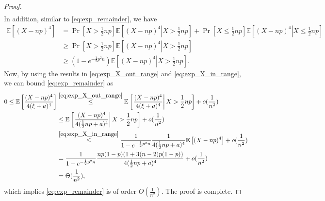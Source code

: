 \documentclass[10pt,a4paper]{amsart}
\newcommand{\EE}{{\mathbb{E}}}
\begin{document}
\begin{proof}
\begin{equation}
\begin{aligned}
			\end{aligned}\label{eq:exp_X_out_range}
		\end{equation}
		In addition, similar to \eqref{eq:exp_remainder}, we have
		\begin{equation}
			\begin{aligned}
				\EE \left[ (X - np)^4 \right] &= \Pr\left[ X > \frac{1}{2} np \right] \EE \left[ \left. (X - np)^4 \right| X > \frac{1}{2}np \right] + \Pr\left[ X \leq \frac{1}{2} np \right] \EE \left[ \left. (X - np)^4 \right| X \leq \frac{1}{2}np \right] \\
				&\geq \Pr\left[ X > \frac{1}{2} np \right] \EE \left[ \left. (X - np)^4 \right| X > \frac{1}{2}np \right] \\
				&\geq \left( 1 - e^{-\frac{1}{2} p^2 n} \right) \EE \left[ \left. (X - np)^4 \right| X > \frac{1}{2}np \right].
			\end{aligned}\label{eq:exp_X_in_range}
		\end{equation}
		Now, by using the results in \eqref{eq:exp_X_out_range} and \eqref{eq:exp_X_in_range}, we can bound \eqref{eq:exp_remainder} as
		\begin{equation}
			\begin{aligned}
				0 \leq \EE \left[ \frac{(X - np)^4}{4 (\xi + a)^4} \right] &\overset{\eqref{eq:exp_X_out_range}}{\leq} \EE \left[ \left. \frac{(X - np)^4}{4 (\xi + a)^4} \right| X > \frac{1}{2}np \right] + o(\frac{1}{n^2}) \\
				&\leq \EE \left[ \left. \frac{(X - np)^4}{4 (\frac{1}{2}np + a)^4} \right| X > \frac{1}{2}np \right] + o(\frac{1}{n^2}) \\
				&\overset{\eqref{eq:exp_X_in_range}}{\leq} \frac{1}{1 - e^{-\frac{1}{2} p^2 n}} \frac{1}{4 (\frac{1}{2}np + a)^4} \EE \left[ (X - np)^4 \right] + o(\frac{1}{n^2}) \\
				&= \frac{1}{1 - e^{-\frac{1}{2} p^2 n}} \frac{np(1-p)(1+ 3(n-2)p(1-p))}{4 (\frac{1}{2}np + a)^4} + o(\frac{1}{n^2}) \\
				&= \Theta(\frac{1}{n^2}),
			\end{aligned}
		\end{equation}
		which implies \eqref{eq:exp_remainder} is of order $O(\frac{1}{n^2})$. The proof is complete.
	\end{proof}
\end{document}

